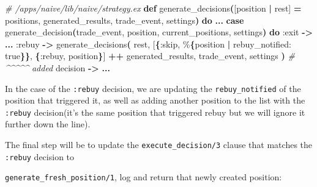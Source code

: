 \documentclass[
  oneside]{book}
\newenvironment{Shaded}{\begin{snugshade}}{\end{snugshade}}
\newcommand{\CommentTok}[1]{\textcolor[rgb]{0.56,0.35,0.01}{\textit{#1}}}
\newcommand{\ConstantTok}[1]{\textcolor[rgb]{0.56,0.35,0.01}{#1}}
\newcommand{\FunctionTok}[1]{\textcolor[rgb]{0.13,0.29,0.53}{\textbf{#1}}}
\newcommand{\KeywordTok}[1]{\textcolor[rgb]{0.13,0.29,0.53}{\textbf{#1}}}
\newcommand{\NormalTok}[1]{#1}
\newcommand{\OperatorTok}[1]{\textcolor[rgb]{0.81,0.36,0.00}{\textbf{#1}}}
\newcommand{\OtherTok}[1]{\textcolor[rgb]{0.56,0.35,0.01}{#1}}
\newcommand{\VariableTok}[1]{\textcolor[rgb]{0.00,0.00,0.00}{#1}}
\begin{document}
\begin{Shaded}
\begin{Highlighting}[]
  \CommentTok{\# /apps/naive/lib/naive/strategy.ex}
  \KeywordTok{def}\NormalTok{ generate\_decisions}\FunctionTok{(}\OtherTok{[}\NormalTok{position }\OperatorTok{|}\NormalTok{ rest}\OtherTok{]} \OperatorTok{=}\NormalTok{ positions, generated\_results, trade\_event, settings}\FunctionTok{)} \KeywordTok{do}
    \OperatorTok{...}
    \KeywordTok{case}\NormalTok{ generate\_decision}\FunctionTok{(}\NormalTok{trade\_event, position, current\_positions, settings}\FunctionTok{)} \KeywordTok{do}
      \VariableTok{:exit} \OperatorTok{{-}\textgreater{}} \OperatorTok{...}
      \VariableTok{:rebuy} \OperatorTok{{-}\textgreater{}}
\NormalTok{        generate\_decisions}\FunctionTok{(}
\NormalTok{          rest,}
          \OtherTok{[}\FunctionTok{\{}\VariableTok{:skip}\NormalTok{, \%}\FunctionTok{\{}\NormalTok{position }\OperatorTok{|} \VariableTok{rebuy\_notified:} \ConstantTok{true}\FunctionTok{\}\}}\NormalTok{, }\FunctionTok{\{}\VariableTok{:rebuy}\NormalTok{, position}\FunctionTok{\}}\OtherTok{]} \OperatorTok{++}\NormalTok{ generated\_results,}
\NormalTok{          trade\_event,}
\NormalTok{          settings}
        \FunctionTok{)} \CommentTok{\# \^{}\^{}\^{}\^{}\^{} added}
\NormalTok{      decision }\OperatorTok{{-}\textgreater{}} \OperatorTok{...}
\end{Highlighting}
\end{Shaded}

In the case of the \texttt{:rebuy} decision, we are updating the \texttt{rebuy\_notified} of the position that triggered it, as well as adding another position to the list with the \texttt{:rebuy} decision(it's the same position that triggered rebuy but we will ignore it further down the line).

The final step will be to update the \texttt{execute\_decision/3} clause that matches the \texttt{:rebuy} decision to

\texttt{generate\_fresh\_position/1}, log and return that newly created position:
\end{document}
